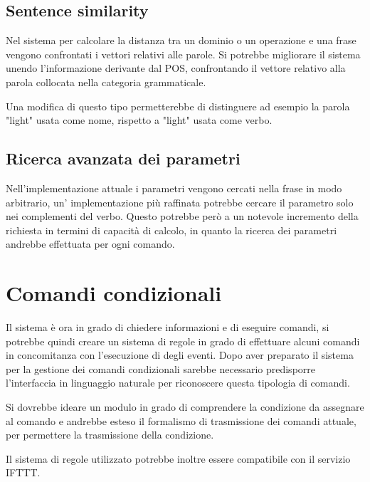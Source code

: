 \documentclass[twoside]{supsistudent}
\begin{document}
\subsection{Sentence similarity}
Nel sistema per calcolare la distanza tra un dominio o un operazione e una frase vengono confrontati i vettori relativi alle parole. Si potrebbe migliorare il sistema unendo l'informazione derivante dal POS, confrontando il vettore relativo alla parola collocata nella categoria grammaticale.

Una modifica di questo tipo permetterebbe di distinguere ad esempio la parola "light" usata come nome, rispetto a "light" usata come verbo.
\subsection{Ricerca avanzata dei parametri}
Nell'implementazione attuale i parametri vengono cercati nella frase in modo arbitrario, un' implementazione più raffinata potrebbe cercare il parametro solo nei complementi del verbo. Questo potrebbe però a un notevole incremento della richiesta in termini di capacità di calcolo, in quanto la ricerca dei parametri andrebbe effettuata per ogni comando.

\section{Comandi condizionali}
Il sistema è ora in grado di chiedere informazioni e di eseguire comandi, si potrebbe quindi creare un sistema di regole in grado di effettuare alcuni comandi in concomitanza con l'esecuzione di degli eventi.
Dopo aver preparato il sistema per la gestione dei comandi condizionali sarebbe necessario predisporre l'interfaccia in linguaggio naturale per riconoscere questa tipologia di comandi.

Si dovrebbe ideare un modulo in grado di comprendere la condizione da assegnare al comando e andrebbe esteso il formalismo di trasmissione dei comandi attuale, per permettere la trasmissione della condizione.

Il sistema di regole utilizzato potrebbe inoltre essere compatibile con il servizio IFTTT.\cite{ifttt}
\end{document}
